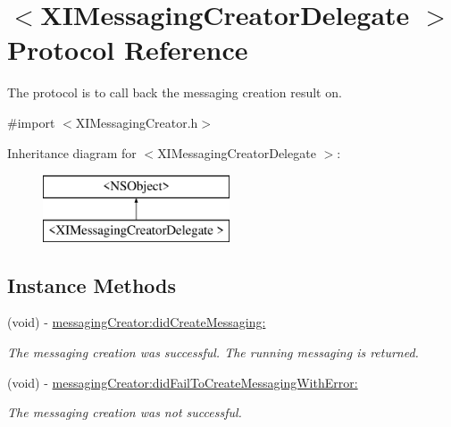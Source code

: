 \hypertarget{protocol_x_i_messaging_creator_delegate_01-p}{}\section{$<$X\+I\+Messaging\+Creator\+Delegate $>$ Protocol Reference}
\label{protocol_x_i_messaging_creator_delegate_01-p}


The protocol is to call back the messaging creation result on.  




{\ttfamily \#import $<$X\+I\+Messaging\+Creator.\+h$>$}

Inheritance diagram for $<$X\+I\+Messaging\+Creator\+Delegate $>$\+:\begin{figure}[H]
\begin{center}
\leavevmode
\includegraphics[height=2.000000cm]{protocol_x_i_messaging_creator_delegate_01-p}
\end{center}
\end{figure}
\subsection*{Instance Methods}
\begin{DoxyCompactItemize}
\item 
(void) -\/ \hyperlink{protocol_x_i_messaging_creator_delegate_01-p_adb133e0f0103fd9c782f5dcb444093e8}{messaging\+Creator\+:did\+Create\+Messaging\+:}
\begin{DoxyCompactList}\small\item\em The messaging creation was successful. The running messaging is returned. \end{DoxyCompactList}\item 
(void) -\/ \hyperlink{protocol_x_i_messaging_creator_delegate_01-p_ab6785dae82b6fe547d4b19ed56d5a5cd}{messaging\+Creator\+:did\+Fail\+To\+Create\+Messaging\+With\+Error\+:}
\begin{DoxyCompactList}\small\item\em The messaging creation was not successful. \end{DoxyCompactList}\end{DoxyCompactItemize}


